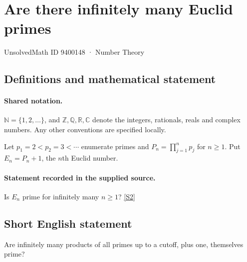 \documentclass[11pt]{article}
\newcommand{\sref}[2]{\hyperlink{source:#1:#2}{[S#2]}}
\begin{document}
\setcounter{section}{9400147}
\section{Are there infinitely many Euclid primes}\label{9400148}
{\small\sffamily UnsolvedMath ID 9400148 · Number Theory}
\subsection{Definitions and mathematical statement}

\paragraph{Shared notation.}$\mathbb N=\{1,2,\ldots\}$, and $\mathbb Z,\mathbb Q,\mathbb R,\mathbb C$ denote the integers, rationals, reals and complex numbers. Any other conventions are specified locally.


Let $p_1=2<p_2=3<\cdots$ enumerate primes and $P_n=\prod_{j=1}^{n}p_j$ for $n\ge1$. Put $E_n=P_n+1$, the $n$th Euclid number.
\paragraph{Statement recorded in the supplied source.}
Is $E_n$ prime for infinitely many $n\ge1$? \sref{9400148}{2}
\subsection{Short English statement}
Are infinitely many products of all primes up to a cutoff, plus one, themselves prime?
\end{document}
